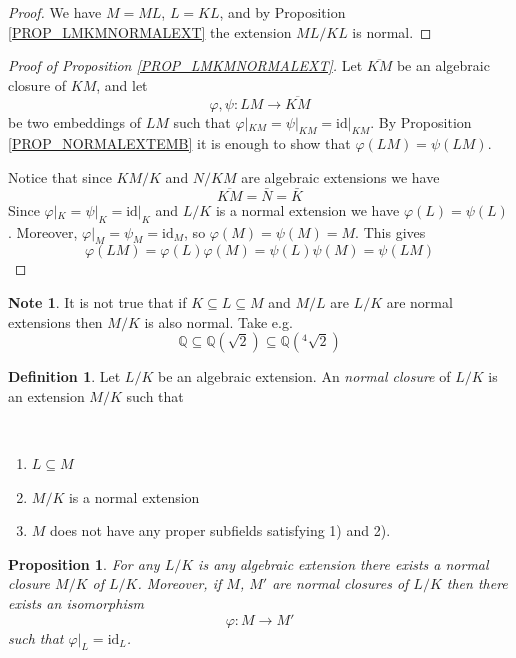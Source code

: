 \documentclass[12pt, letterpaper, oneside]{article}
\theoremstyle{plain}
\newtheorem{proposition}[theorem]{Proposition}
\theoremstyle{definition}
\newtheorem{definition}[theorem]{Definition}
\newtheorem{note}[theorem]{Note}
\newcommand{\Q}{{\mathbb Q}}
\newcommand{\id}{\mathrm{id}}
\newcommand{\benu}{\begin{enumerate}}
\newcommand{\eenu}{\end{enumerate}}
\newcommand{\vs}{\vskip 5mm}
\newcommand{\isep}[1][0]{\setlength{\itemsep}{#1 mm}}
\begin{document}
\vs

\begin{proof}
We have $M = ML$, $L= KL$, and by Proposition \ref{PROP_LMKMNORMALEXT} 
the extension $ML/KL$ is normal.  
\end{proof}


\vs\vs

\begin{proof}[Proof of Proposition \ref{PROP_LMKMNORMALEXT}]
Let $\overline{KM}$ be an algebraic closure of $KM$, and let 
$$\varphi, \psi\colon LM \to \overline{KM}$$
be two embeddings of $LM$ such that $\varphi|_{KM} = \psi|_{KM} = \id|_{KM}$.
By Proposition \ref{PROP_NORMALEXTEMB} it is enough to show that $\varphi(LM) = \psi(LM)$.  

Notice that since $KM/K$ and $N/KM$ are algebraic extensions we have  
$$\overline{KM} = \bar{N} = \bar{K}$$ 
Since $\varphi|_{K} = \psi|_{K} = \id|_{K}$ and 
$L/K$ is a normal extension we have $\varphi(L) = \psi(L)$. Moreover, 
$\varphi|_{M} = \psi_{M}=\id_{M}$, so $\varphi(M) = \psi(M) = M$. 
This gives 
$$\varphi(LM) = \varphi(L)\varphi(M) = \psi(L)\psi(M) = \psi(LM)$$   
\end{proof}


\vs\vs

\begin{note}
It is not true that if $K \subseteq L \subseteq M$ and $M/L$ are $L/K$ are normal extensions 
then $M/K$ is also normal. Take e.g. 
$$\Q\subseteq \Q(\sqrt{2}) \subseteq \Q(^{4}\!\!\!\sqrt{2})$$
\end{note}


\vs\vs



\begin{definition}
Let $L/K$ be an algebraic extension. An \emph{normal closure}  of $L/K$ is an 
extension  $M/K$ such that 

\vskip -13mm

\ 
\benu
\isep[0]
\item $L\subseteq M$ 
\item $M/K$ is a normal extension
\item $M$ does not have any proper subfields satisfying 1) and 2). 
\eenu 
  
\end{definition}


\vs\vs


\begin{proposition}
For any  $L/K$ is any algebraic extension there exists a normal closure $M/K$ of $L/K$. 
Moreover, if $M$, $M'$ are normal closures of $L/K$ then there exists an isomorphism 
$$\varphi\colon M \to M'$$
such that $\varphi|_{L} = \id_{L}$.
\end{proposition}
\end{document}
